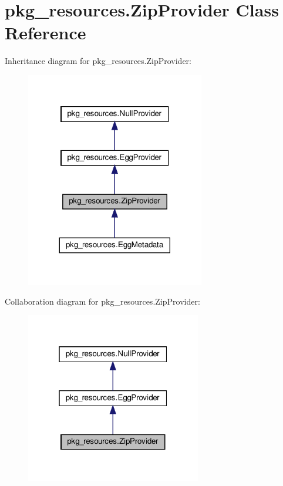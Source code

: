 \hypertarget{classpkg__resources_1_1ZipProvider}{}\section{pkg\+\_\+resources.\+Zip\+Provider Class Reference}
\label{classpkg__resources_1_1ZipProvider}


Inheritance diagram for pkg\+\_\+resources.\+Zip\+Provider\+:
\nopagebreak
\begin{figure}[H]
\begin{center}
\leavevmode
\includegraphics[width=221pt]{classpkg__resources_1_1ZipProvider__inherit__graph}
\end{center}
\end{figure}


Collaboration diagram for pkg\+\_\+resources.\+Zip\+Provider\+:
\nopagebreak
\begin{figure}[H]
\begin{center}
\leavevmode
\includegraphics[width=217pt]{classpkg__resources_1_1ZipProvider__coll__graph}
\end{center}
\end{figure}

